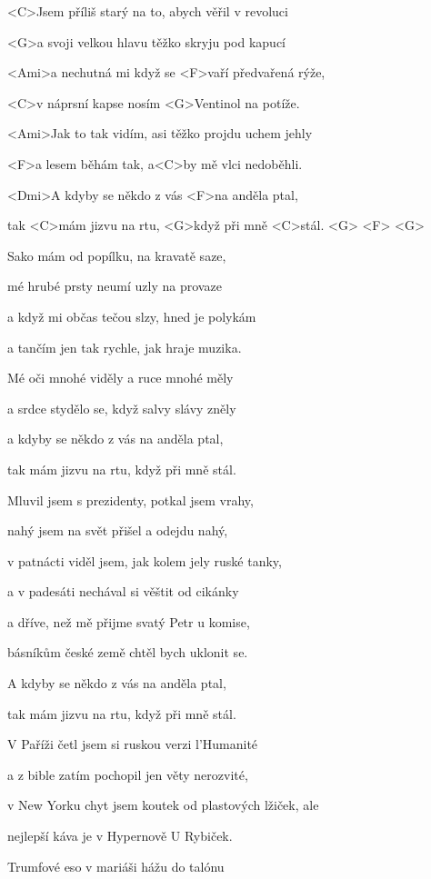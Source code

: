

\zs
<C>Jsem příliš starý na to, abych věřil v revoluci

<G>a svoji velkou hlavu těžko skryju pod kapucí

<Ami>a nechutná mi když se <F>vaří předvařená rýže,

<C>v náprsní kapse nosím <G>Ventinol na potíže.

<Ami>Jak to tak vidím, asi těžko projdu uchem jehly

<F>a lesem běhám tak, a<C>by mě vlci nedoběhli.

<Dmi>A kdyby se někdo z vás <F>na anděla ptal,

tak <C>mám jizvu na rtu, <G>když při mně <C>stál. <G> <F> <G>
\ks

\zs
Sako mám od popílku, na kravatě saze,

mé hrubé prsty neumí uzly na provaze

a když mi občas tečou slzy, hned je polykám

a tančím jen tak rychle, jak hraje muzika.

Mé oči mnohé viděly a ruce mnohé měly

a srdce stydělo se, když salvy slávy zněly

a kdyby se někdo z vás na anděla ptal,

tak mám jizvu na rtu, když při mně stál.
\ks

\zs
Mluvil jsem s prezidenty, potkal jsem vrahy,

nahý jsem na svět přišel a odejdu nahý,

v patnácti viděl jsem, jak kolem jely ruské tanky,

a v padesáti nechával si věštit od cikánky

a dříve, než mě přijme svatý Petr u komise,

básníkům české země chtěl bych uklonit se.

A kdyby se někdo z vás na anděla ptal,

tak mám jizvu na rtu, když při mně stál.
\ks

\zs
V Paříži četl jsem si ruskou verzi l'Humanité

a z bible zatím pochopil jen věty nerozvité,

v New Yorku chyt jsem koutek od plastových lžiček, ale

nejlepší káva je v Hypernově U Rybiček.

Trumfové eso v mariáši hážu do talónu

